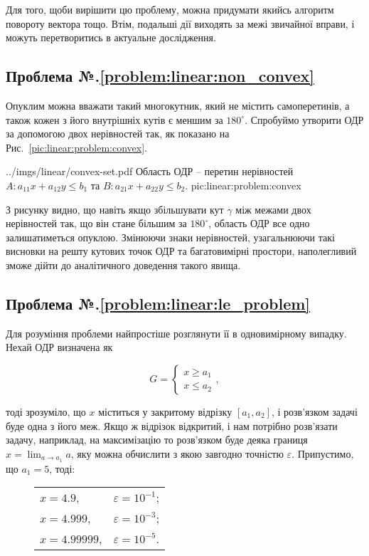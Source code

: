 \documentclass[\main/book.tex]{subfiles}
\begin{document}
Для того, щоби вирішити цю проблему, можна придумати якийсь алгоритм повороту вектора тощо. Втім, подальші дії виходять за межі звичайної вправи, і можуть перетворитись в актуальне дослідження.

\subsection*{Проблема №.\ref{problem:linear:non_convex}}

Опуклим можна вважати такий многокутник, який не містить самоперетинів, а також кожен з його внутрішніх кутів є меншим за $180^\circ$. Спробуймо утворити ОДР за допомогою двох нерівностей так, як показано на Рис.~\ref{pic:linear:problem:convex}.

\illustration
 {../imgs/linear/convex-set.pdf}
 {Область ОДР -- перетин нерівностей ${A: a_{11} x + a_{12} y \leq b_1}$ та ${B: a_{21} x + a_{22} y \leq b_2}$.}
 {pic:linear:problem:convex}

З рисунку видно, що навіть якщо збільшувати кут $\gamma$ між межами двох нерівностей так, що він стане більшим за $180^\circ$, область ОДР все одно залишатиметься опуклою. Змінюючи знаки нерівностей, узагальнюючи такі висновки на решту кутових точок ОДР та багатовимірні простори, наполегливий зможе дійти до аналітичного доведення такого явища.

\subsection*{Проблема №.\ref{problem:linear:le_problem}}

Для розуміння проблеми найпростіше розглянути її в одновимірному випадку. Нехай ОДР визначена як

\[
 G = \left\{
  \begin{array}{l}
   x \geq a_1 \\
   x \leq a_2
  \end{array}
 \right.,
\]

тоді зрозуміло, що $x$ міститься у закритому відрізку $[a_1, a_2]$, і розв'язком задачі буде одна з його меж. Якщо ж відрізок відкритий, і нам потрібно розв'язати задачу, наприклад, на максимізацію то розв'язком буде деяка границя $x = \displaystyle \lim_{a \to a_1} a$, яку можна обчислити з якою завгодно точністю $\varepsilon$. Припустимо, що $a_1 = 5$, тоді:

\begin{figure}[!h]
 \center
 \begin{tabular}{ll}
  $x = 4.9$,     & $\varepsilon = 10^{-1}$; \\
  $x = 4.999$,   & $\varepsilon = 10^{-3}$; \\
  $x = 4.99999$, & $\varepsilon = 10^{-5}$.
 \end{tabular}
\end{figure}
\end{document}
